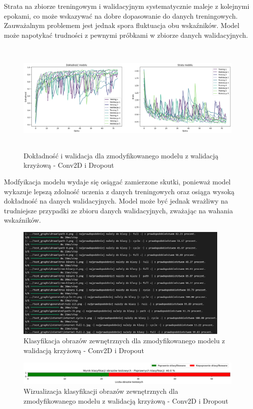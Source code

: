 Strata na zbiorze treningowym i walidacyjnym systematycznie maleje z kolejnymi epokami,
co może wskazywać na dobre dopasowanie do danych treningowych.
Zauważalnym problemem jest jednak spora fluktuacja obu wskaźników.
Model może napotykać trudności z pewnymi próbkami w zbiorze danych walidacyjnych. 

\begin{figure}[ht]
	\centering
	\includegraphics[height=5.5cm]{resources/tests/images/v4/crossvalid_1_img.png}
	\caption{Dokładność i walidacja dla zmodyfikowanego modelu z walidacją krzyżową - Conv2D i Dropout}
	\label{Fig:tests-cv-1a}
\end{figure}
\FloatBarrier

Modfyikacja modelu wydaje się osiągać zamierzone skutki,
ponieważ model wykazuje lepszą zdolność uczenia z danych treningowych
oraz osiąga wysoką dokładność na danych walidacyjnych.
Model może być jednak wrażliwy na trudniejsze przypadki ze zbioru danych walidacyjnych,
zważając na wahania wskaźników.

\begin{figure}[ht]
	\centering
	\includegraphics[height=5.5cm]{resources/tests/images/v4/crossvalid_1_txt.png}
	\caption{Klasyfikacja obrazów zewnętrznych dla zmodyfikowanego modelu z walidacją krzyżową - Conv2D i Dropout}
	\label{Fig:tests-cv-1b}
\end{figure}
\FloatBarrier

\begin{figure}[ht]
	\centering
	\includegraphics[width=14cm]{resources/tests/images/v4/crossvalid_1_bar.png}
	\caption{Wizualizacja klasyfikacji obrazów zewnętrznych dla zmodyfikowanego modelu z walidacją krzyżową - Conv2D i Dropout}
	\label{Fig:tests-cv-1c}
\end{figure}
\FloatBarrier

